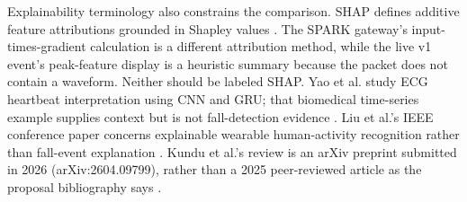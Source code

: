 Explainability terminology also constrains the comparison. SHAP defines additive feature attributions grounded in Shapley values \cite{lundberg2017shap}. The SPARK gateway's input-times-gradient calculation is a different attribution method, while the live v1 event's peak-feature display is a heuristic summary because the packet does not contain a waveform. Neither should be labeled SHAP. Yao et al. study ECG heartbeat interpretation using CNN and GRU; that biomedical time-series example supplies context but is not fall-detection evidence \cite{yao2021interpretation}. Liu et al.'s IEEE conference paper concerns explainable wearable human-activity recognition rather than fall-event explanation \cite{liu2024explainable}. Kundu et al.'s review is an arXiv preprint submitted in 2026 (arXiv:2604.09799), rather than a 2025 peer-reviewed article as the proposal bibliography says \cite{kundu2025explainable}.

